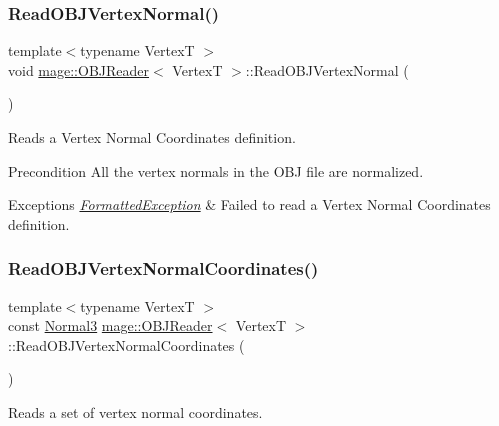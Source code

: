 \subsubsection{\texorpdfstring{Read\+O\+B\+J\+Vertex\+Normal()}{ReadOBJVertexNormal()}}
{\footnotesize\ttfamily template$<$typename VertexT $>$ \\
void \hyperlink{classmage_1_1_o_b_j_reader}{mage\+::\+O\+B\+J\+Reader}$<$ VertexT $>$\+::Read\+O\+B\+J\+Vertex\+Normal (\begin{DoxyParamCaption}{ }\end{DoxyParamCaption})\hspace{0.3cm}{\ttfamily [private]}}

Reads a Vertex Normal Coordinates definition.

\begin{DoxyPrecond}{Precondition}
All the vertex normals in the O\+BJ file are normalized. 
\end{DoxyPrecond}

\begin{DoxyExceptions}{Exceptions}
{\em \hyperlink{classmage_1_1_formatted_exception}{Formatted\+Exception}} & Failed to read a Vertex Normal Coordinates definition. \\
\hline
\end{DoxyExceptions}
\hypertarget{classmage_1_1_o_b_j_reader_a2be022b43cf2ad848c7a2d013b16e5f2}{}\label{classmage_1_1_o_b_j_reader_a2be022b43cf2ad848c7a2d013b16e5f2} 
\subsubsection{\texorpdfstring{Read\+O\+B\+J\+Vertex\+Normal\+Coordinates()}{ReadOBJVertexNormalCoordinates()}}
{\footnotesize\ttfamily template$<$typename VertexT $>$ \\
const \hyperlink{structmage_1_1_normal3}{Normal3} \hyperlink{classmage_1_1_o_b_j_reader}{mage\+::\+O\+B\+J\+Reader}$<$ VertexT $>$\+::Read\+O\+B\+J\+Vertex\+Normal\+Coordinates (\begin{DoxyParamCaption}{ }\end{DoxyParamCaption})\hspace{0.3cm}{\ttfamily [private]}}

Reads a set of vertex normal coordinates.

